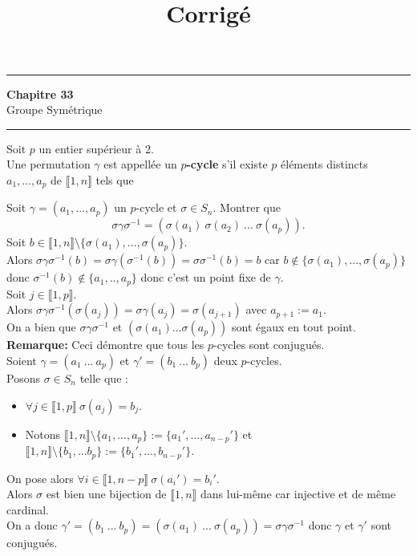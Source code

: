 \documentclass[11pt]{article}
\title{\bf{\pagetitle}\\\large{Corrigé}}
\def\pagetitle{Groupe Symétrique}
\newcommand*{\lb}{\llbracket}
\newcommand*{\rb}{\rrbracket}
\newcommand{\0}{\varnothing}
\newcommand*{\g}{\gamma}
\newcommand*{\s}{\sigma}
\begin{document}
\thispagestyle{fancy}
\fancyhead[C]{\pagetitle}

\hrule
\begin{center}
    \LARGE{\textbf{Chapitre 33}}\\
    \large{\pagetitle}\\
    \rule{0.8\textwidth}{0.5pt}
\end{center}


\vspace{0.5cm}

\begin{def}{}{}
    Soit $p$ un entier supérieur à 2.\\
    Une permutation $\g$ est appellée un $p$\textbf{-cycle} s'il existe $p$ éléments distincts $a_1,...,a_p$ de $\lb1,n\rb$ tels que 
\end{def}


\begin{ex}{}{}
    Soit $\g=(a_1,...,a_p)$ un $p$-cycle et $\s\in S_n$. Montrer que
    \begin{equation*}
        \s\g\s^{-1}=(\s(a_1)~\s(a_2)~...~\s(a_p)).
    \end{equation*}
    \tcblower
    Soit $b\in\lb1,n\rb\setminus\{\s(a_1),...,\s(a_p)\}$.\\
    Alors $\s\g\s^{-1}(b)=\s\g(\s^{-1}(b))=\s\s^{-1}(b)=b$ car $b\notin\{\s(a_1),...,\s(a_p)\}$ donc $\s^{-1}(b)\notin\{a_1,..,a_p\}$ donc c'est un point fixe de $\g$.\\[0.2cm]
    Soit $j\in\lb1,p\rb$.\\
    Alors $\s\g\s^{-1}(\s(a_j))=\s\g(a_j)=\s(a_{j+1})$ avec $a_{p+1}:=a_1$.\\
    On a bien que $\s\g\s^{-1}$ et $(\s(a_1)...\s(a_p))$ sont égaux en tout point.\\[0.2cm]
    \textbf{Remarque:} Ceci démontre que tous les $p$-cycles sont conjugués.\\
    Soient $\g=(a_1~...~a_p)$ et $\g'=(b_1~...~b_p)$ deux $p$-cycles.\\
    Posons $\s\in S_n$ telle que :
    \begin{itemize}
        \item $\forall j \in \lb 1, p \rb ~ \s(a_j) = b_j$.
        \item Notons $\lb 1, n \rb \setminus \{a_1, ..., a_p\} := \{a_1', ..., a_{n-p}'\}$ et $\lb 1, n \rb \setminus \{b_1, ... b_p\} := \{b_1', ... , b_{n-p}'\}$.
    \end{itemize}
    On pose alors $\forall i\in\lb1,n-p\rb ~ \s(a_i')=b_i'$.\\
    Alors $\s$ est bien une bijection de $\lb1,n\rb$ dans lui-même car injective et de même cardinal.\\
    On a donc $\g'=(b_1~...~b_p) = (\s(a_1)~...~\s(a_p))=\s\g\s^{-1}$ donc $\g$ et $\g'$ sont conjugués.
\end{ex}
\end{document}
